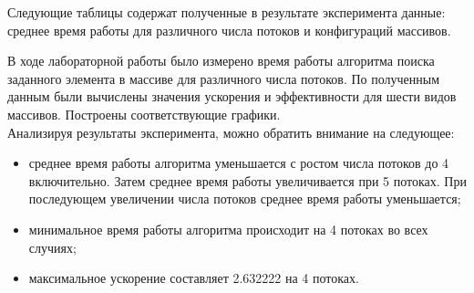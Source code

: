 
Следующие таблицы содержат полученные в результате эксперимента данные: среднее время работы для различного числа потоков и конфигураций массивов.



\begin{adjustwidth}{-1cm}{}
\end{adjustwidth}


\begin{adjustwidth}{-1cm}{}
\end{adjustwidth}


\begin{adjustwidth}{-1cm}{}
\end{adjustwidth}


\begin{adjustwidth}{-1cm}{}
\end{adjustwidth}


\begin{adjustwidth}{-1cm}{}
\end{adjustwidth}


\begin{adjustwidth}{-1cm}{}
\end{adjustwidth}




В ходе лабораторной работы было измерено время работы алгоритма поиска заданного элемента в массиве для различного числа потоков. По полученным данным были вычислены значения ускорения и эффективности для шести видов массивов. Построены соответствующие графики.\\
Анализируя результаты эксперимента, можно обратить внимание на следующее:

\vspace{3mm}
\begin{itemize}
\setlength{\itemsep}{10pt}
    \item среднее время работы алгоритма уменьшается с ростом числа потоков до 4 включительно. Затем среднее время работы увеличивается при 5 потоках. При последующем увеличении числа потоков среднее время работы уменьшается;
    \item минимальное время работы алгоритма происходит на 4 потоках во всех случиях;
    \item максимальное ускорение составляет 2.632222 на 4 потоках.
\end{itemize}
\vspace{3mm}


